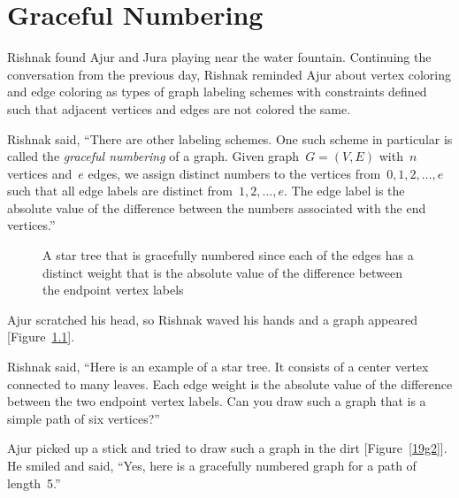 \chapter{Graceful Numbering}

Rishnak found Ajur and Jura playing near the water fountain. Continuing the conversation from the previous day, Rishnak reminded Ajur about vertex coloring and edge coloring as types of graph labeling schemes with constraints defined such that adjacent vertices and edges are not colored the same.

Rishnak said, ``There are other labeling schemes. One such scheme in particular is called the \textit{graceful numbering} of a graph. Given graph~$G=(V,E)$ with~$n$ vertices and~$e$ edges, we assign distinct numbers to the vertices from~$0,1,2,\ldots,e$ such that all edge labels are distinct from~$1,2,\ldots,e$. The edge label is the absolute value of the difference between the numbers associated with the end vertices.''

\begin{figure}
\begin{center}
\caption{A star tree that is gracefully numbered since each of the edges has a distinct weight that is the absolute value of the difference between the endpoint vertex labels}\label{19g1}
\end{center}
\end{figure}

Ajur scratched his head, so Rishnak waved his hands and a graph appeared [Figure~\ref{19g1}].

Rishnak said, ``Here is an example of a star tree. It consists of a center vertex connected to many leaves.  Each edge weight is the absolute value of the difference between the two endpoint vertex labels. Can you draw such a graph that is a simple path of six vertices?''

Ajur picked up a stick and tried to draw such a graph in the dirt [Figure~\ref{19g2}].  He smiled and said, ``Yes, here is a gracefully numbered graph for a path of length~5.''

